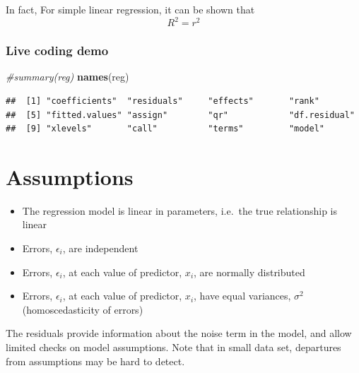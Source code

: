 \documentclass[]{article}
\newenvironment{Shaded}{\begin{snugshade}}{\end{snugshade}}
\newcommand{\CommentTok}[1]{\textcolor[rgb]{0.56,0.35,0.01}{\textit{#1}}}
\newcommand{\DecValTok}[1]{\textcolor[rgb]{0.00,0.00,0.81}{#1}}
\newcommand{\KeywordTok}[1]{\textcolor[rgb]{0.13,0.29,0.53}{\textbf{#1}}}
\newcommand{\NormalTok}[1]{#1}
\newcommand{\OperatorTok}[1]{\textcolor[rgb]{0.81,0.36,0.00}{\textbf{#1}}}
\newcommand{\StringTok}[1]{\textcolor[rgb]{0.31,0.60,0.02}{#1}}
\providecommand{\tightlist}{%
  \setlength{\itemsep}{0pt}\setlength{\parskip}{0pt}}
\begin{document}
In fact, For simple linear regression, it can be shown that \[R^2=r^2\]

\hypertarget{live-coding-demo-3}{%
\subsubsection{Live coding demo}\label{live-coding-demo-3}}

\begin{Shaded}
\begin{Highlighting}[]
\CommentTok{#summary(reg)}
\KeywordTok{names}\NormalTok{(reg)}
\end{Highlighting}
\end{Shaded}

\begin{verbatim}
##  [1] "coefficients"  "residuals"     "effects"       "rank"         
##  [5] "fitted.values" "assign"        "qr"            "df.residual"  
##  [9] "xlevels"       "call"          "terms"         "model"
\end{verbatim}

\begin{Shaded}
\end{Shaded}

\hypertarget{assumptions}{%
\section{Assumptions}\label{assumptions}}

\begin{itemize}
\tightlist
\item
  The regression model is linear in parameters, i.e.~the true
  relationship is linear
\item
  Errors, \(\epsilon_i\), are independent
\item
  Errors, \(\epsilon_i\), at each value of predictor, \(x_i\), are
  normally distributed
\item
  Errors, \(\epsilon_i\), at each value of predictor, \(x_i\), have
  equal variances, \(\sigma^2\) (homoscedasticity of errors)
\end{itemize}

The residuals provide information about the noise term in the model, and
allow limited checks on model assumptions. Note that in small data set,
departures from assumptions may be hard to detect.
\end{document}
